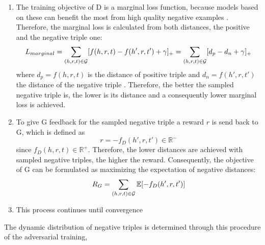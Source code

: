 \begin{enumerate}
    \item 
    The training objective of D is a marginal loss function, because models based on these can  benefit the most from high quality negative examples .
    Therefore, the marginal loss is calculated from both distances, the positive and the negative triple one:
     \begin{equation}
        L_{marginal}
        =\sum_{(h,r,t)\in\mathcal{G}}[f(h,r,t)-f(h',r,t')+\gamma]_+ 
        = \sum_{(h,r,t)\in\mathcal{G}}[d_p-d_n+\gamma]_+ 
    \end{equation}
    where $d_p = f(h,r,t)$ is the distance of positive triple  and $d_n = f(h',r,t')$ the distance of the negative triple  .
    Therefore, the better the sampled negative triple is, the lower is its distance and a consequently lower marginal loss is achieved.
    
    \item 
    To give G feedback for the sampled negative triple  a reward $r$ is send back to G, which is defined as
    \begin{equation}
        r = -f_D(h',r,t') \in \mathbb{R}^-
    \end{equation}
    since $f_D(h,r,t) \in \mathbb{R}^+$.
    Therefore, the lower distances are achieved with sampled negative triples, the higher the reward.
    Consequently, the objective of G can be formulated as maximizing the expectation of negative distances:
    \begin{equation}
        R_G=\sum_{(h,r,t)\in\mathcal{G}}\mathbb{E}[-f_D(h',r,t')]
    \end{equation}
    
    \item
    This process continues until convergence
\end{enumerate}
The dynamic distribution of negative triples is determined through this procedure of the adversarial training, 